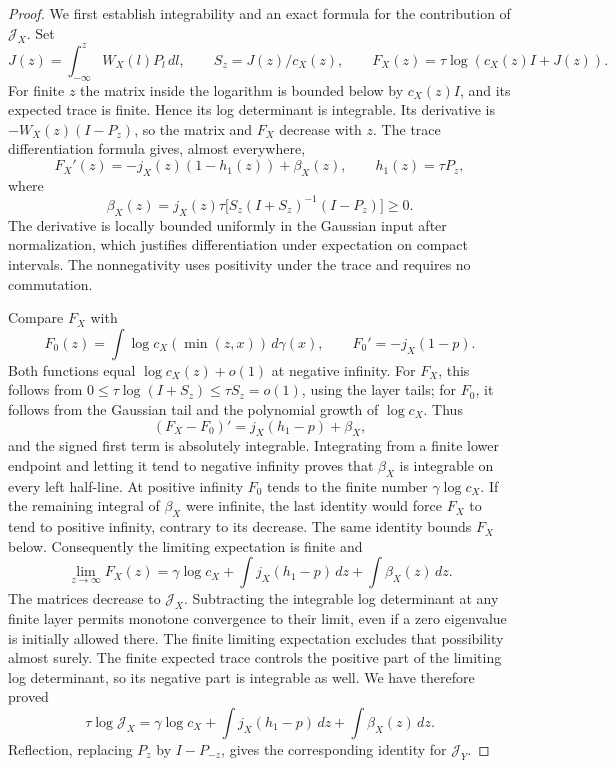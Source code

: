 \begin{proof}
We first establish integrability and an exact formula for the contribution of \(\mathcal J_X\). Set
\[
J(z)=\int_{-\infty}^zW_X(l)P_l\,dl,\qquad
S_z=J(z)/c_X(z),\qquad F_X(z)=\tau\log(c_X(z)I+J(z)).
\]
For finite \(z\) the matrix inside the logarithm is bounded below by \(c_X(z)I\), and its expected trace is finite. Hence its log determinant is integrable. Its derivative is \(-W_X(z)(I-P_z)\), so the matrix and \(F_X\) decrease with \(z\). The trace differentiation formula gives, almost everywhere,
\[
F_X'(z)=-j_X(z)(1-h_1(z))+\beta_X(z),\qquad
h_1(z)=\tau P_z,
\]
where
\[
\beta_X(z)=j_X(z)\tau\bigl[S_z(I+S_z)^{-1}(I-P_z)\bigr]\ge0.
\]
The derivative is locally bounded uniformly in the Gaussian input after normalization, which justifies differentiation under expectation on compact intervals. The nonnegativity uses positivity under the trace and requires no commutation.

Compare \(F_X\) with
\[
F_0(z)=\int\log c_X(\min(z,x))\,d\gamma(x),\qquad
F_0'=-j_X(1-p).
\]
Both functions equal \(\log c_X(z)+o(1)\) at negative infinity. For \(F_X\), this follows from
\(0\le\tau\log(I+S_z)\le\tau S_z=o(1)\), using the layer tails; for \(F_0\), it follows from the Gaussian tail and the polynomial growth of \(\log c_X\). Thus
\[
(F_X-F_0)'=j_X(h_1-p)+\beta_X,
\]
and the signed first term is absolutely integrable. Integrating from a finite lower endpoint and letting it tend to negative infinity proves that \(\beta_X\) is integrable on every left half-line. At positive infinity \(F_0\) tends to the finite number \(\gamma\log c_X\). If the remaining integral of \(\beta_X\) were infinite, the last identity would force \(F_X\) to tend to positive infinity, contrary to its decrease. The same identity bounds \(F_X\) below. Consequently the limiting expectation is finite and
\[
\lim_{z\to\infty}F_X(z)
=\gamma\log c_X+\int j_X(h_1-p)\,dz+\int\beta_X(z)\,dz.
\]
The matrices decrease to \(\mathcal J_X\). Subtracting the integrable log determinant at any finite layer permits monotone convergence to their limit, even if a zero eigenvalue is initially allowed there. The finite limiting expectation excludes that possibility almost surely. The finite expected trace controls the positive part of the limiting log determinant, so its negative part is integrable as well. We have therefore proved
\[
\tau\log\mathcal J_X
=\gamma\log c_X+\int j_X(h_1-p)\,dz+\int\beta_X(z)\,dz.
\]
Reflection, replacing \(P_z\) by \(I-P_{-z}\), gives the corresponding identity for \(\mathcal J_Y\).


\end{proof}

